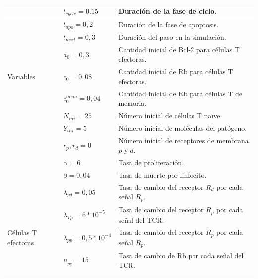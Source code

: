\begin{table}[h]
	\begin{center}
		\begin{tabular}{>{\centering\arraybackslash}m{2cm} >{\arraybackslash}m{3cm} >{\arraybackslash}m{7cm} }%
			\hline
			\multirow{9}{*}{} & $t_{cycle} = 0.15$               & Duración de la fase de ciclo.                             \\ \cline{2-3}
			& $t_{apo} = 0,2$                  & Duración de la fase de apoptosis.                         \\ \cline{2-3}
			& $t_{next} = 0,3$                 & Duración del paso en la simulación.                       \\ \cline{2-3}
			& $a_0 = 0,3$                      & Cantidad inicial de Bcl-2 para células T efectoras.       \\ \cline{2-3}
			Variables         & $c_0 = 0,08$                     & Cantidad inicial de Rb para células T efectoras.          \\ \cline{2-3}
			& $c_0^{mem} = 0,04$               & Cantidad inicial de Rb para células T de memoria.         \\ \cline{2-3}
			& $N_{ini} = 25$                   & Número inicial de células T naïve.                        \\ \cline{2-3}
			& $Y_{ini} = 5$                    & Número inicial de moléculas del patógeno.                 \\ \cline{2-3}
			& $r_p, r_d = 0$                   & Número inicial de receptores de membrana $p$ y $d$.       \\ \hline
			\multirow{2}{*}{Patógeno}  & $\alpha = 6$                    & Tasa de proliferación.                                    \\ \cline{2-3}
			& $\beta = 0,04$                    & Tasa de muerte por linfocito.                             \\ \hline
			\multirow{5}{*}{} & $\lambda_{pd} = 0,05$            & Tasa de cambio del receptor $R_d$ por cada señal $R_p$.   \\ \cline{2-3}
			& $\lambda_{Tp} = 6*10^{-5}$       & Tasa de cambio del receptor $R_p$ por cada señal del TCR. \\ \cline{2-3}
			Células T  efectoras       & $\lambda_{pp} = 0,5*10^{-4}$     & Tasa de cambio del receptor $R_p$ por cada señal $R_p$.   \\ \cline{2-3}
			& $\mu_{pc} = 15$                 & Tasa de cambio de Rb por cada señal del TCR.              \\ \cline{2-3}

\end{tabular}
\end{center}
\end{table}
